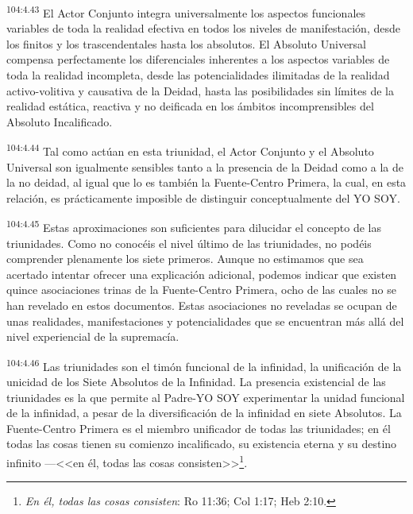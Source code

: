 \par
\textsuperscript{104:4.43} El Actor Conjunto integra universalmente los aspectos funcionales variables de toda la realidad efectiva en todos los niveles de manifestación, desde los finitos y los trascendentales hasta los absolutos. El Absoluto Universal compensa perfectamente los diferenciales inherentes a los aspectos variables de toda la realidad incompleta, desde las potencialidades ilimitadas de la realidad activo-volitiva y causativa de la Deidad, hasta las posibilidades sin límites de la realidad estática, reactiva y no deificada en los ámbitos incomprensibles del Absoluto Incalificado.

\par
\textsuperscript{104:4.44} Tal como actúan en esta triunidad, el Actor Conjunto y el Absoluto Universal son igualmente sensibles tanto a la presencia de la Deidad como a la de la no deidad, al igual que lo es también la Fuente-Centro Primera, la cual, en esta relación, es prácticamente imposible de distinguir conceptualmente del YO SOY.

\par
\textsuperscript{104:4.45} Estas aproximaciones son suficientes para dilucidar el concepto de las triunidades. Como no conocéis el nivel último de las triunidades, no podéis comprender plenamente los siete primeros. Aunque no estimamos que sea acertado intentar ofrecer una explicación adicional, podemos indicar que existen quince asociaciones trinas de la Fuente-Centro Primera, ocho de las cuales no se han revelado en estos documentos. Estas asociaciones no reveladas se ocupan de unas realidades, manifestaciones y potencialidades que se encuentran más allá del nivel experiencial de la supremacía.

\par
\textsuperscript{104:4.46} Las triunidades son el timón funcional de la infinidad, la unificación de la unicidad de los Siete Absolutos de la Infinidad. La presencia existencial de las triunidades es la que permite al Padre-YO SOY experimentar la unidad funcional de la infinidad, a pesar de la diversificación de la infinidad en siete Absolutos. La Fuente-Centro Primera es el miembro unificador de todas las triunidades; en él todas las cosas tienen su comienzo incalificado, su existencia eterna y su destino infinito ---<<en él, todas las cosas consisten>>\footnote{\textit{En él, todas las cosas consisten}: Ro 11:36; Col 1:17; Heb 2:10.}.

